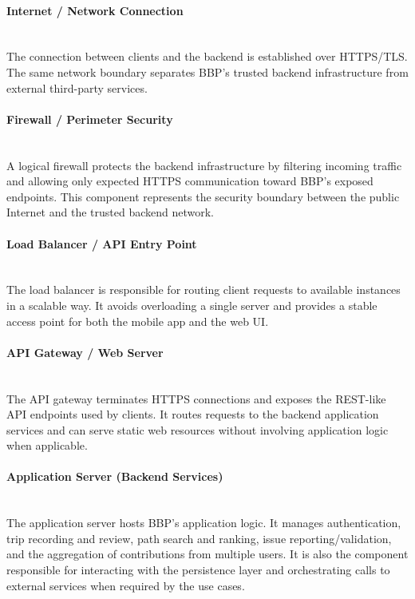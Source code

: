 \paragraph{Internet / Network Connection} \mbox{}\\
The connection between clients and the backend is established over HTTPS/TLS.
The same network boundary separates BBP's trusted backend infrastructure from external
third-party services.

\paragraph{Firewall / Perimeter Security} \mbox{}\\
A logical firewall protects the backend infrastructure by filtering incoming traffic and allowing
only expected HTTPS communication toward BBP's exposed endpoints. This component
represents the security boundary between the public Internet and the trusted backend
network.

\paragraph{Load Balancer / API Entry Point} \mbox{}\\
The load balancer is responsible for routing client requests to available instances in a
scalable way. It avoids overloading a single server and provides a stable access point for
both the mobile app and the web UI.

\paragraph{API Gateway / Web Server} \mbox{}\\
The API gateway terminates HTTPS connections and exposes the REST-like API endpoints
used by clients. It routes requests to the backend application services and can serve static
web resources without involving application logic when applicable.

\paragraph{Application Server (Backend Services)} \mbox{}\\
The application server hosts BBP's application logic. It manages authentication, trip
recording and review, path search and ranking, issue reporting/validation, and the
aggregation of contributions from multiple users. It is also the component responsible for
interacting with the persistence layer and orchestrating calls to external services when
required by the use cases.

